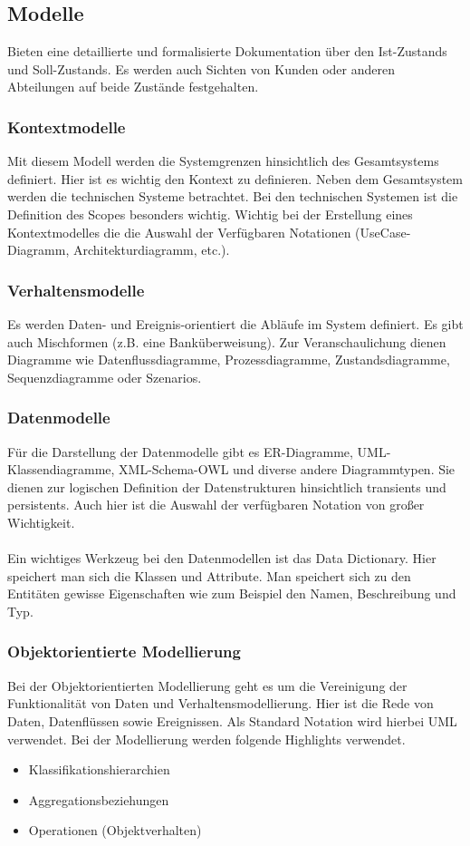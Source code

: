 \subsection{Modelle}
Bieten eine detaillierte und formalisierte Dokumentation über den Ist-Zustands und Soll-Zustands. Es werden auch Sichten von Kunden oder anderen Abteilungen auf beide Zustände festgehalten. 
\subsubsection{Kontextmodelle}
Mit diesem Modell werden die Systemgrenzen hinsichtlich des Gesamtsystems definiert. Hier ist es wichtig den Kontext zu definieren. Neben dem Gesamtsystem werden die technischen Systeme betrachtet. Bei den technischen Systemen ist die Definition des Scopes besonders wichtig. Wichtig bei der Erstellung eines Kontextmodelles die die Auswahl der Verfügbaren Notationen (UseCase-Diagramm, Architekturdiagramm, etc.).

\subsubsection{Verhaltensmodelle}
Es werden Daten- und Ereignis-orientiert die Abläufe im System definiert. Es gibt auch Mischformen (z.B. eine Banküberweisung). Zur Veranschaulichung dienen Diagramme wie Datenflussdiagramme, Prozessdiagramme, Zustandsdiagramme, Sequenzdiagramme oder Szenarios. 

\subsubsection{Datenmodelle}
Für die Darstellung der Datenmodelle gibt es ER-Diagramme, UML-Klassendiagramme, XML-Schema-OWL und diverse andere Diagrammtypen. Sie dienen zur logischen Definition der Datenstrukturen hinsichtlich transients und persistents. Auch hier ist die Auswahl der verfügbaren Notation von großer 
Wichtigkeit.
\\\\
Ein wichtiges Werkzeug bei den Datenmodellen ist das Data Dictionary. Hier speichert man sich die Klassen und Attribute. Man speichert sich zu den Entitäten gewisse Eigenschaften wie zum Beispiel den Namen, Beschreibung und Typ.

\subsubsection{Objektorientierte Modellierung}
Bei der Objektorientierten Modellierung geht es um die Vereinigung der Funktionalität von Daten und Verhaltensmodellierung. Hier ist die Rede von Daten, Datenflüssen sowie Ereignissen. Als Standard Notation wird hierbei UML verwendet. Bei der Modellierung werden folgende Highlights verwendet.
\begin{itemize}
\item Klassifikationshierarchien
\item Aggregationsbeziehungen
\item Operationen (Objektverhalten)
\end{itemize}

